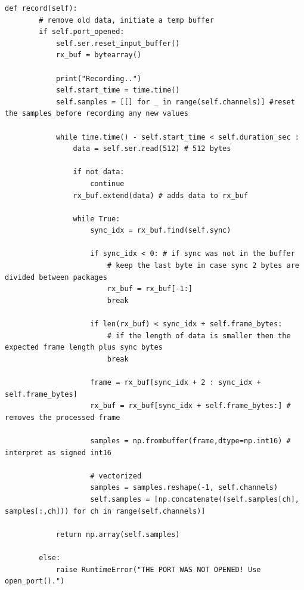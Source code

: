     \begin{lstlisting}[style=pythonstyle, caption={Record the signal method. Was originally generated by \cite{chatgpt2026}, but was modified during the debuging process}, label={lst:record_method}]
    def record(self):
        # remove old data, initiate a temp buffer
        if self.port_opened:
            self.ser.reset_input_buffer() 
            rx_buf = bytearray()

            print("Recording..")
            self.start_time = time.time()
            self.samples = [[] for _ in range(self.channels)] #reset the samples before recording any new values
            
            while time.time() - self.start_time < self.duration_sec :
                data = self.ser.read(512) # 512 bytes
                
                if not data:
                    continue
                rx_buf.extend(data) # adds data to rx_buf

                while True:
                    sync_idx = rx_buf.find(self.sync) 

                    if sync_idx < 0: # if sync was not in the buffer
                        # keep the last byte in case sync 2 bytes are divided between packages
                        rx_buf = rx_buf[-1:]
                        break

                    if len(rx_buf) < sync_idx + self.frame_bytes:
                        # if the length of data is smaller then the expected frame length plus sync bytes
                        break

                    frame = rx_buf[sync_idx + 2 : sync_idx + self.frame_bytes]
                    rx_buf = rx_buf[sync_idx + self.frame_bytes:] # removes the processed frame 

                    samples = np.frombuffer(frame,dtype=np.int16) # interpret as signed int16
                    
                    # vectorized 
                    samples = samples.reshape(-1, self.channels)
                    self.samples = [np.concatenate((self.samples[ch], samples[:,ch])) for ch in range(self.channels)]
    
            return np.array(self.samples)

        else:
            raise RuntimeError("THE PORT WAS NOT OPENED! Use open_port().")

        \end{lstlisting}
    
